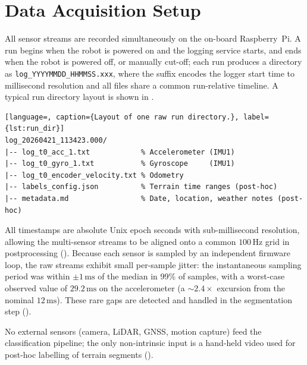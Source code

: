 \section{Data Acquisition Setup}

All sensor streams are recorded simultaneously on the on-board Raspberry~Pi. A run begins when the robot is powered on and the logging service starts, and ends when the robot is powered off, or manually cut-off; each run produces a directory as \texttt{log\_YYYYMMDD\_HHMMSS\allowbreak .xxx}, where the suffix encodes the logger start time to millisecond resolution and all files share a common run-relative timeline. A typical run directory layout is shown in .

\begin{lstlisting}[language=, caption={Layout of one raw run directory.}, label={lst:run_dir}]
log_20260421_113423.000/
|-- log_t0_acc_1.txt            % Accelerometer (IMU1)
|-- log_t0_gyro_1.txt           % Gyroscope     (IMU1)
|-- log_t0_encoder_velocity.txt % Odometry
|-- labels_config.json          % Terrain time ranges (post-hoc)
|-- metadata.md                 % Date, location, weather notes (post-hoc)
\end{lstlisting}

All timestamps are absolute Unix epoch seconds with sub-millisecond resolution, allowing the multi-sensor streams to be aligned onto a common $100\,\text{Hz}$ grid in postprocessing (). Because each sensor is sampled by an independent firmware loop, the raw streams exhibit small per-sample jitter: the instantaneous sampling period was within $\pm 1\,\text{ms}$ of the median in 99\% of samples, with a worst-case observed value of $29.2\,\text{ms}$ on the accelerometer (a $\sim 2.4\times$ excursion from the nominal $12\,\text{ms}$). These rare gaps are detected and handled in the segmentation step ().

No external sensors (camera, LiDAR, GNSS, motion capture) feed the classification pipeline; the only non-intrinsic input is a hand-held video used for post-hoc labelling of terrain segments ().